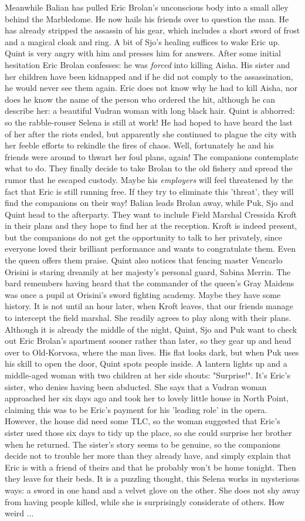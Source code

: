 Meanwhile Balian has pulled Eric Brolan's unconscious body into a small alley behind the Marbledome. He now hails his friends over to question the man. He has already stripped the assassin of his gear, which includes a short sword of frost and a magical cloak and ring. A bit of Sjo's healing suffices to wake Eric up. Quint is very angry with him and presses him for answers. After some initial hesitation Eric Brolan confesses: he was {\itshape forced} into killing Aisha. His sister and her children have been kidnapped and if he did not comply to the assassination, he would never see them again. Eric does not know why he had to kill Aisha, nor does he know the name of the person who ordered the hit, although he can describe her: a beautiful Vudran woman with long black hair. Quint is abhorred: so the rabble-rouser Selena is still at work! He had hoped to have heard the last of her after the riots ended, but apparently she continued to plague the city with her feeble efforts to rekindle the fires of chaos. Well, fortunately he and his friends were around to thwart her foul plans, again! The companions contemplate what to do. They finally decide to take Brolan to the old fishery and spread the rumor that he escaped custody. Maybe his {\itshape employers} will feel threatened by the fact that Eric is still running free. If they try to eliminate this 'threat', they will find the companions on their way! Balian leads Brolan away, while Puk, Sjo and Quint head to the afterparty. They want to include Field Marshal Cressida Kroft in their plans and they hope to find her at the reception. Kroft is indeed present, but the companions do not get the opportunity to talk to her privately, since everyone loved their brilliant performance and wants to congratulate them. Even the queen offers them praise. Quint also notices that fencing master Vencarlo Orisini is staring dreamily at her majesty's personal guard, Sabina Merrin. The bard remembers having heard that the commander of the queen's Gray Maidens was once a pupil at Orisini's sword fighting academy. Maybe they have some history. It is not until an hour later, when Kroft leaves, that our friends manage to intercept the field marshal. She readily agrees to play along with their plans. Although it is already the middle of the night, Quint, Sjo and Puk want to check out Eric Brolan's apartment sooner rather than later, so they gear up and head over to Old-Korvosa, where the man lives. His flat looks dark, but when Puk uses his skill to open the door, Quint spots people inside. A lantern lights up and a middle-aged woman with two children at her side shouts: "Surprise!". It's Eric's sister, who denies having been abducted. She says that a Vudran woman approached her six days ago and took her to lovely little house in North Point, claiming this was to be Eric's payment for his 'leading role' in the opera. However, the house did need some TLC, so the woman suggested that Eric's sister used those six days to tidy up the place, so she could surprise her brother when he returned. The sister's story seems to be genuine, so the companions decide not to trouble her more than they already have, and simply explain that Eric is with a friend of theirs and that he probably won't be home tonight. Then they leave for their beds. It is a puzzling thought, this Selena works in mysterious ways: a sword in one hand and a velvet glove on the other. She does not shy away from having people killed, while she is surprisingly considerate of others. How weird ...\\

